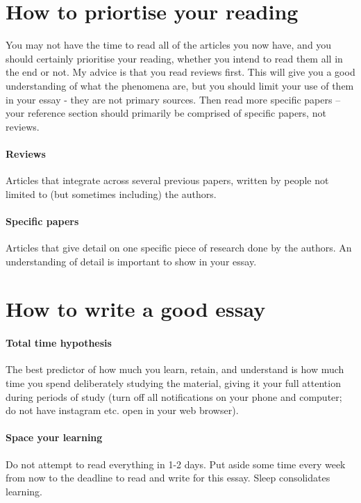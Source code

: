 \documentclass[11pt]{article}
\begin{document}
\section*{How to priortise your reading}

You may not have the time to read all of the articles you now have, and you should certainly prioritise your reading, whether you intend to read them all in the end or not. My advice is that you read reviews first. This will give you a good understanding of what the phenomena are, but you should limit your use of them in your essay - they are not primary sources. Then read more specific papers -- your reference section should primarily be comprised of specific papers, not reviews. 

\paragraph{Reviews} Articles that integrate across several previous papers, written by people not limited to (but sometimes including) the authors. 

\paragraph{Specific papers} Articles that give detail on one specific piece of research done by the authors. An understanding of detail is important to show in your essay. 

\section*{How to write a good essay}

\paragraph{Total time hypothesis} The best predictor of how much you learn, retain, and understand is how much time you spend deliberately studying the material, giving it your full attention during periods of study (turn off all notifications on your phone and computer; do not have instagram etc. open in your web browser). 

\paragraph{Space your learning} Do not attempt to read everything in 1-2 days. Put aside some time every week from now to the deadline to read and write for this essay. Sleep consolidates learning.
\end{document}
